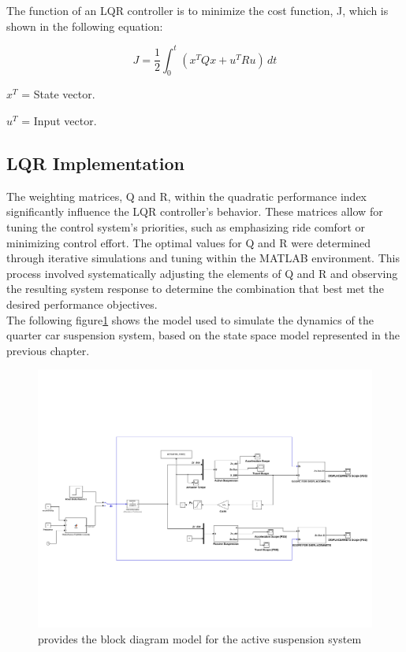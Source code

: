 \newpage
The function of an LQR controller is to minimize the cost function, J, which is shown in the following equation:

\[
J = \frac{1}{2} \int_{0}^{t} (x^{T}Qx + u^{T}Ru) \, dt 
\]

$x^{T}$ = State vector. 

$u^{T}$ = Input vector.


\subsection{LQR Implementation}
The weighting matrices, Q and R, within the quadratic performance index significantly influence the LQR controller's behavior. These matrices allow for tuning the control system's priorities, such as emphasizing ride comfort or minimizing control effort. The optimal values for Q and R were determined through iterative simulations and tuning within the MATLAB environment. This process involved systematically adjusting the elements of Q and R and observing the resulting system response to determine the combination that best met the desired performance objectives.\\ 

The following figure\ref{fig:lqr-final} shows the model used to simulate the dynamics of the quarter car suspension system, based on the state space model represented in the previous chapter. 

        \begin{figure}[H]
	\centering
	\includegraphics[trim=0cm 5cm 0cm 5cm, clip, width=1\linewidth]{figures/lqr-final.pdf}
	\caption{provides the block diagram model for the active suspension system}
	\label{fig:lqr-final}
\end{figure}


